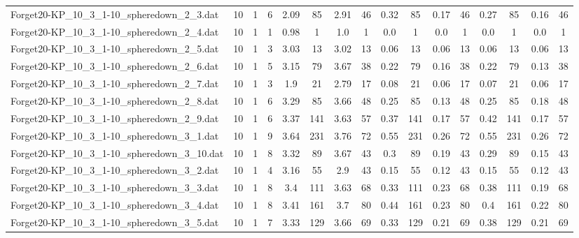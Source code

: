 \begin{sidewaystable}[!ht]
{\begin{tabular}{lccccccccccccccc}
Forget20-KP\_10\_3\_1-10\_spheredown\_2\_3.dat & 10 & 1 & 6 & 2.09 & 85 & 2.91 & 46 & 0.32 & 85 & 0.17 & 46 & 0.27 & 85 &  \textcolor{blue2}{0.16} & 46 \\
Forget20-KP\_10\_3\_1-10\_spheredown\_2\_4.dat & 10 & 1 & 1 & 0.98 & 1 & 1.0 & 1 &  \textcolor{blue2}{0.0} & 1 &  \textcolor{blue2}{0.0} & 1 &  \textcolor{blue2}{0.0} & 1 &  \textcolor{blue2}{0.0} & 1 \\
Forget20-KP\_10\_3\_1-10\_spheredown\_2\_5.dat & 10 & 1 & 3 & 3.03 & 13 & 3.02 & 13 &  \textcolor{blue2}{0.06} & 13 &  \textcolor{blue2}{0.06} & 13 &  \textcolor{blue2}{0.06} & 13 &  \textcolor{blue2}{0.06} & 13 \\
Forget20-KP\_10\_3\_1-10\_spheredown\_2\_6.dat & 10 & 1 & 5 & 3.15 & 79 & 3.67 & 38 & 0.22 & 79 & 0.16 & 38 & 0.22 & 79 &  \textcolor{blue2}{0.13} & 38 \\
Forget20-KP\_10\_3\_1-10\_spheredown\_2\_7.dat & 10 & 1 & 3 & 1.9 & 21 & 2.79 & 17 & 0.08 & 21 &  \textcolor{blue2}{0.06} & 17 & 0.07 & 21 &  \textcolor{blue2}{0.06} & 17 \\
Forget20-KP\_10\_3\_1-10\_spheredown\_2\_8.dat & 10 & 1 & 6 & 3.29 & 85 & 3.66 & 48 & 0.25 & 85 &  \textcolor{blue2}{0.13} & 48 & 0.25 & 85 & 0.18 & 48 \\
Forget20-KP\_10\_3\_1-10\_spheredown\_2\_9.dat & 10 & 1 & 6 & 3.37 & 141 & 3.63 & 57 & 0.37 & 141 &  \textcolor{blue2}{0.17} & 57 & 0.42 & 141 &  \textcolor{blue2}{0.17} & 57 \\
Forget20-KP\_10\_3\_1-10\_spheredown\_3\_1.dat & 10 & 1 & 9 & 3.64 & 231 & 3.76 & 72 & 0.55 & 231 &  \textcolor{blue2}{0.26} & 72 & 0.55 & 231 &  \textcolor{blue2}{0.26} & 72 \\
Forget20-KP\_10\_3\_1-10\_spheredown\_3\_10.dat & 10 & 1 & 8 & 3.32 & 89 & 3.67 & 43 & 0.3 & 89 & 0.19 & 43 & 0.29 & 89 &  \textcolor{blue2}{0.15} & 43 \\
Forget20-KP\_10\_3\_1-10\_spheredown\_3\_2.dat & 10 & 1 & 4 & 3.16 & 55 & 2.9 & 43 & 0.15 & 55 &  \textcolor{blue2}{0.12} & 43 & 0.15 & 55 &  \textcolor{blue2}{0.12} & 43 \\
Forget20-KP\_10\_3\_1-10\_spheredown\_3\_3.dat & 10 & 1 & 8 & 3.4 & 111 & 3.63 & 68 & 0.33 & 111 & 0.23 & 68 & 0.38 & 111 &  \textcolor{blue2}{0.19} & 68 \\
Forget20-KP\_10\_3\_1-10\_spheredown\_3\_4.dat & 10 & 1 & 8 & 3.41 & 161 & 3.7 & 80 & 0.44 & 161 & 0.23 & 80 & 0.4 & 161 &  \textcolor{blue2}{0.22} & 80 \\
Forget20-KP\_10\_3\_1-10\_spheredown\_3\_5.dat & 10 & 1 & 7 & 3.33 & 129 & 3.66 & 69 & 0.33 & 129 &  \textcolor{blue2}{0.21} & 69 & 0.38 & 129 &  \textcolor{blue2}{0.21} & 69 \\

\end{tabular}}
\end{sidewaystable}
